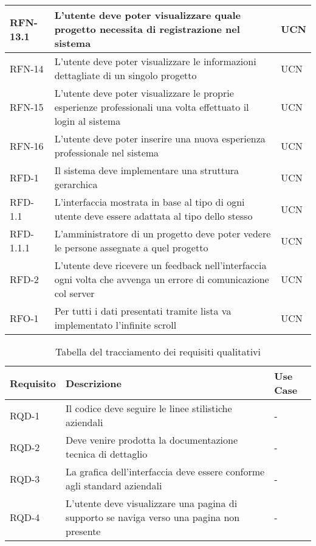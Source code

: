 \begin{table}
\begin{tabularx}{\textwidth}{lXl}
\hline
RFN-13.1 & L'utente deve poter visualizzare quale progetto necessita di registrazione nel sistema & UCN \\
\hline
RFN-14 & L'utente deve poter visualizzare le informazioni dettagliate di un singolo progetto & UCN \\
\hline
RFN-15 & L'utente deve poter visualizzare le proprie esperienze professionali una volta effettuato il login al sistema & UCN \\
\hline
RFN-16 & L'utente deve poter inserire una nuova esperienza professionale nel sistema & UCN \\
\hline
RFD-1 & Il sistema deve implementare una struttura gerarchica & UCN \\
\hline
RFD-1.1 & L'interfaccia mostrata in base al tipo di ogni utente deve essere adattata al tipo dello stesso & UCN \\
\hline
RFD-1.1.1 & L'amministratore di un progetto deve poter vedere le persone assegnate a quel progetto & UCN \\
\hline
RFD-2 & L'utente deve ricevere un feedback nell'interfaccia ogni volta che avvenga un errore di comunicazione col server & UCN \\
\hline
RFO-1 & Per tutti i dati presentati tramite lista va implementato l'infinite scroll & UCN \\
\hline
\end{tabularx}
\end{table}%

\begin{table}%
\caption{Tabella del tracciamento dei requisiti qualitativi}
\label{tab:requisiti-qualitativi}
\begin{tabularx}{\textwidth}{lXl}
\hline\hline
\textbf{Requisito} & \textbf{Descrizione} & \textbf{Use Case}\\
\hline
RQD-1 & Il codice deve seguire le linee stilistiche aziendali & - \\
\hline
RQD-2 & Deve venire prodotta la documentazione tecnica di dettaglio & - \\
\hline
RQD-3 & La grafica dell'interfaccia deve essere conforme agli standard aziendali & - \\
\hline
RQD-4 & L'utente deve visualizzare una pagina di supporto se naviga verso una pagina non presente & - \\
\hline
\end{tabularx}
\end{table}%

